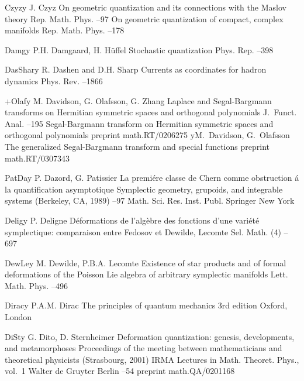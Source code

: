 \documentclass[11pt]{amsart}
\numberwithin{equation}{section}
\theoremstyle{remark}
\newcommand{\by}{\mathbf y}
\begin{document}
\begin{thebibliography}{199}
 Czyz\by{ J. Czyz \paper On geometric quantization and its connections
with the Maslov theory \jour Rep. Math. Phys.   --97
\moreref \paper On geometric quantization of compact, complex manifolds \jour
Rep. Math. Phys.   --178}

 Damg\by{ P.H. Damgaard, H. H\"uffel \paper Stochastic quantization \jour
Phys. Rep.   --398}

 DasShar\by{ R. Dashen and D.H. Sharp \paper Currents as coordinates for
hadron dynamics \jour Phys. Rev.   --1866}

 +Olaf\by{ M. Davidson, G. Olafsson, G. Zhang \paper Laplace and
Segal-Bargmann transforms on Hermitian symmetric spaces and orthogonal
polynomials \jour J.~Funct. Anal.   --195 \moreref
\paper Segal-Bargmann transform on Hermitian symmetric spaces and orthogonal
polynomials \paperinfo preprint math.RT/0206275 \moreref \by M.~Davidson,
G.~Olafsson \paper The generalized Segal-Bargmann transform and special
functions \paperinfo preprint math.RT/0307343}

 PatDa\by{ P. Dazord, G. Patissier \paper La premi\'ere classe de Chern
comme obstruction \'a la quantification asymptotique \inbook Symplectic
geometry, grupoids, and integrable systems (Berkeley, CA, 1989) --97
\bookinfo Math. Sci. Res. Inst. Publ.  \publ Springer \publaddr New York
}

 Delig\by{ P. Deligne \paper D\'eformations de l'alg\`ebre des fonctions
d'une vari\'et\'e symplectique: comparaison entre Fedosov et Dewilde, Lecomte
\jour Sel. Math.  (4)  --697}

 DewLe\by{ M. Dewilde, P.B.A. Lecomte \paper Existence of star products
and of formal deformations of the Poisson Lie algebra of arbitrary symplectic
manifolds \jour Lett. Math. Phys.   --496}

 Dirac\by{ P.A.M. Dirac \book The principles of quantum mechanics
\bookinfo 3rd edition \publaddr Oxford, London }

 DiSt\by{ G. Dito, D. Sternheimer \paper Deformation quantization:
genesis, developments, and metamorphoses \inbook Proceedings of the meeting
between mathematicians and theoretical physicists (Strasbourg, 2001) \bookinfo
IRMA Lectures in Math. Theoret. Phys., vol.~1 \publ Walter de Gruyter \publaddr
Berlin  --54 \paperinfo preprint math.QA/0201168}


\end{thebibliography}
\end{document}
